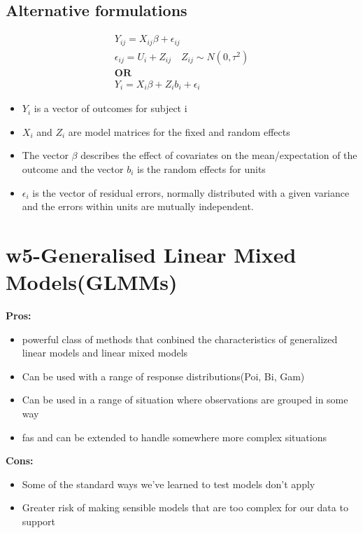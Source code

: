 \documentclass{article}
\theoremstyle{definition}
\theoremstyle{thrm}
\theoremstyle{lma}
\theoremstyle{ppst}
\theoremstyle{crlr}
\begin{document}
\subsection{Alternative formulations}
\begin{align*}
	Y_{ij} = X_{ij}\beta +\epsilon_{ij}\\
	\epsilon_{ij} = U_i+Z_{ij}\quad Z_{ij}\sim N(0,\tau^2)\\
	\textbf{OR}\\
	Y_i = X_i\beta+Z_ib_i+\epsilon_i
\end{align*}
\begin{itemize}
	\item $Y_i$ is a vector of outcomes for subject i
	\item $X_i$ and $Z_i$ are model matrices for the fixed and random effects 
	\item The vector $\beta$ describes the effect of covariates on the mean/expectation of the outcome and the vector $b_i$ is the random effects for units
	\item $\epsilon_i $ is the vector of residual errors, normally distributed with a given variance and the errors within units are mutually independent.
\end{itemize}





\section{w5-Generalised Linear Mixed Models(GLMMs)}
\textbf{Pros:}
\begin{itemize}
	\item powerful class of methods that conbined the characteristics of generalized linear models and linear mixed models
	\item Can be used with a range of response distributions(Poi, Bi, Gam)
	\item Can be used in a range of situation where observations are grouped in some way
	\item fas and can be extended to handle somewhere more complex situations
\end{itemize}
\textbf{Cons:}
\begin{itemize}
	\item Some of the standard ways we've learned to test models don't apply
	\item Greater risk of making sensible models that are too complex for our data to support
\end{itemize}
\end{document}
